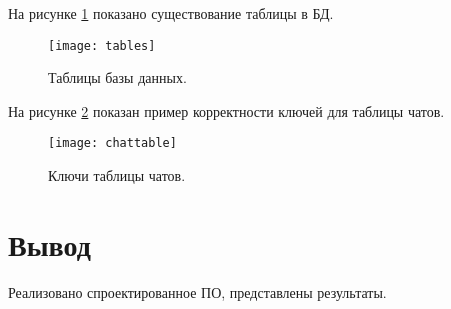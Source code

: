 На рисунке \ref{img:tables} показано существование таблицы в БД. 

\begin{figure}[H]
	\centering
	\texttt{[image: tables]}
	\caption{Таблицы базы данных.  }
	\label{img:tables}
\end{figure}

На рисунке \ref{img:chattable} показан пример корректности ключей для таблицы чатов.  

\begin{figure}[H]
	\centering
	\texttt{[image: chattable]}
	\caption{Ключи таблицы чатов. }
	\label{img:chattable}
\end{figure}


\section{\textbf{Вывод}}

Реализовано спроектированное ПО, представлены результаты. 
